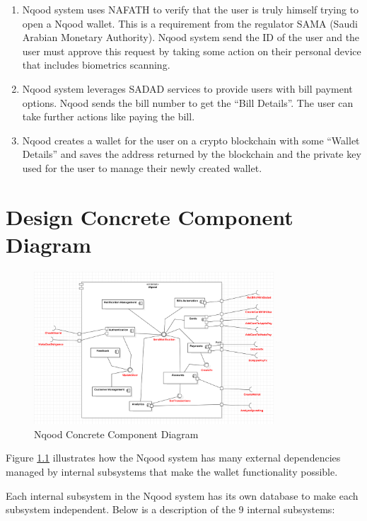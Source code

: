 \documentclass[a4paper]{report}
\begin{document}
\begin{enumerate}
\begin{enumerate}
            \item Nqood system uses NAFATH to verify that the user is truly himself trying to open a Nqood wallet. This is a requirement from the regulator SAMA (Saudi Arabian Monetary Authority). Nqood system send the ID of the user and the user must approve this request by taking some action on their personal device that includes biometrics scanning.
            \item Nqood system leverages SADAD services to provide users with bill payment options. Nqood sends the bill number to get the “Bill Details”. The user can take further actions like paying the bill.
            \item Nqood creates a wallet for the user on a crypto blockchain with some “Wallet Details” and saves the address returned by the blockchain and the private key used for the user to manage their newly created wallet.
            
        \end{enumerate}
\end{enumerate}

\chapter{Design Concrete Component Diagram}

\begin{figure}[h!]
    \centering
    \includegraphics[width=0.8\textwidth]{images/nqood-concrete-component-diagram.png}
    \caption{Nqood Concrete Component Diagram}
    \label{fig:concrete-diagram}
\end{figure}

Figure \ref{fig:concrete-diagram} illustrates how the Nqood system has many external dependencies managed by internal subsystems that make the wallet functionality possible.

Each internal subsystem in the Nqood system has its own database to make each subsystem independent. Below is a description of the 9 internal subsystems:
\end{document}
